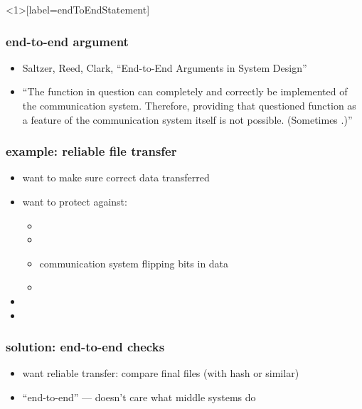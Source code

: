 
\begin{frame}<1>[label=endToEndStatement]\frametitle{end-to-end argument}
    \begin{itemize}
    \item Saltzer, Reed, Clark, ``End-to-End Arguments in System Design''
    \item ``The function in question can completely and correctly be implemented 
     of the communication
    system. Therefore, providing that questioned function as a feature of the communication
    system itself is not possible. (Sometimes 
    .)''
    \end{itemize}
\end{frame}


\begin{frame}\frametitle{example: reliable file transfer}
    \begin{itemize}
    \item want to make sure correct data transferred
    \vspace{.5cm}
    \item want to protect against:
        \begin{itemize}
        \item {}
        \item {}
        \item communication system flipping bits in data
        \item {}
        \end{itemize}
    \vspace{.5cm}
    \item<2-> 
    \item<3-> 
    \end{itemize}
\end{frame}

\begin{frame}\frametitle{solution: end-to-end checks}
    \begin{itemize}
    \item want reliable transfer: compare final files (with hash or similar)
    \vspace{.5cm}
    \item ``end-to-end'' --- doesn't care what middle systems do
    \end{itemize}
\end{frame}


